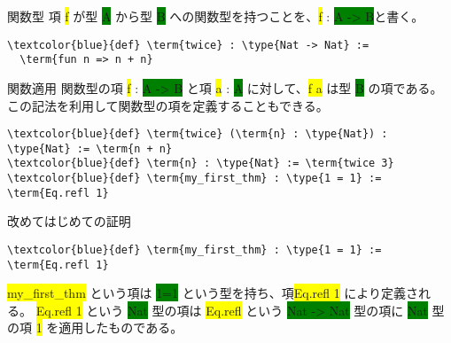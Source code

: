 \documentclass[unicode,12pt]{beamer}%
\newcommand{\type}[1]{\colorbox{green}{#1}}
\newcommand{\term}[1]{\colorbox{yellow}{#1}}
\begin{document}
\begin{frame}[fragile]{関数型}
  項 \term{f} が型 \type{A} から型 \type{B} への関数型を持つことを、\term{f} : \type{A -> B}と書く。

  \pause

  \begin{tcolorbox}[title=FirstTheorem.lean]
  \setlength{\baselineskip}{12pt}
  \begin{Verbatim}[commandchars=\\\{\}, baselinestretch=1.5]
\textcolor{blue}{def} \term{twice} : \type{Nat -> Nat} :=
  \term{fun n => n + n}
  \end{Verbatim}
  \end{tcolorbox}  
\end{frame}


\begin{frame}[fragile]{関数適用}
  関数型の項 \term{f} : \type{A -> B} と項 \term{a} : \type{A} に対して、\term{f a} は型 \type{B} の項である。
  この記法を利用して関数型の項を定義することもできる。

  \pause

  \begin{tcolorbox}[title=FirstTheorem.lean]
  \setlength{\baselineskip}{12pt}
  \begin{Verbatim}[commandchars=\\\{\}, baselinestretch=1.5]
\textcolor{blue}{def} \term{twice} (\term{n} : \type{Nat}) : \type{Nat} := \term{n + n}
\textcolor{blue}{def} \term{n} : \type{Nat} := \term{twice 3}
\textcolor{blue}{def} \term{my_first_thm} : \type{1 = 1} := \term{Eq.refl 1}
  \end{Verbatim}
  \end{tcolorbox}  
\end{frame}

\begin{frame}[fragile]{改めてはじめての証明}
  \begin{tcolorbox}[title=FirstTheorem.lean]
  \setlength{\baselineskip}{12pt}
  \begin{Verbatim}[commandchars=\\\{\}, baselinestretch=1.5]
\textcolor{blue}{def} \term{my_first_thm} : \type{1 = 1} := \term{Eq.refl 1}
  \end{Verbatim}
  \end{tcolorbox}

  \term{my\_first\_thm} という項は \type{1=1} という型を持ち、項\term{Eq.refl 1} により定義される。
  \term{Eq.refl 1} という \type{Nat} 型の項は \term{Eq.refl} という \type{Nat -> Nat} 型の項に \type{Nat} 型の項 \term{1} を適用したものである。
\end{frame}
\end{document}
